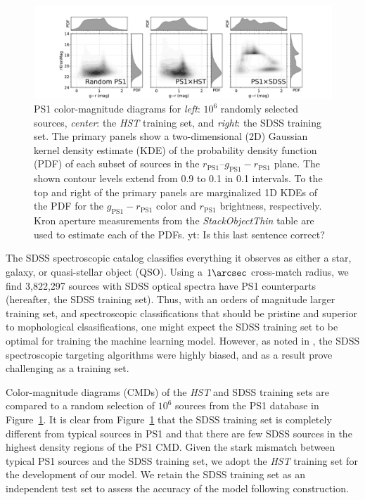 \documentclass[twocolumn]{aastex62}
\newcommand{\yutaro}[1]{{\color{red} yt: {#1}}}
\begin{document}
\begin{figure}[htb]
 \centering
  \includegraphics[width=7.2in]{./Figures/ColorMagDiagramComb.pdf}
  \caption{
  PS1 color-magnitude diagrams for \textit{left}: $10^6$ randomly selected sources, \textit{center}: the \textit{HST} training set, and \textit{right}: the SDSS training set. The primary panels show a two-dimensional (2D) Gaussian kernel density estimate (KDE) of the probability density function (PDF) of each subset of sources in the $r_\mathrm{PS1}$--$g_\mathrm{PS1} - r_\mathrm{PS1}$ plane. The shown contour levels extend from 0.9 to 0.1 in 0.1 intervals. To the top and right of the primary panels are marginalized 1D KDEs of the PDF for the $g_\mathrm{PS1} - r_\mathrm{PS1}$ color and $r_\mathrm{PS1}$ brightness, respectively. Kron aperture measurements from the \textit{StackObjectThin} table are used to estimate each of the PDFs. \yutaro{Is this last sentence correct?}
  }
  \label{fig:cmd}
\end{figure}

The SDSS spectroscopic catalog classifies everything it observes as either a
star, galaxy, or quasi-stellar object (QSO). Using a $1\arcsec$ cross-match
radius, we find 3,822,297 sources with SDSS optical spectra have PS1
counterparts (hereafter, the SDSS training set). Thus, with an orders of
magnitude larger training set, and spectroscopic classifications that should
be pristine and superior to mophological clsasifications, one might expect
the SDSS training set to be optimal for training the machine learning model.
However, as noted in \citep{Miller17}, the SDSS spectroscopic targeting
algorithms were highly biased, and as a result prove challenging as a
training set.

Color-magnitude diagrams (CMDs) of the \textit{HST} and SDSS training sets
are compared to a random selection of $10^6$ sources from the PS1 database in
Figure~\ref{fig:cmd}. It is clear from Figure~\ref{fig:cmd} that the SDSS
training set is completely different from typical sources in PS1 and that
there are few SDSS sources in the highest density regions of the PS1 CMD.
Given the stark mismatch between typical PS1 sources and the SDSS training
set, we adopt the \textit{HST} training set for the development of our model.
We retain the SDSS training set as an independent test set to assess the
accuracy of the model following construction.
\end{document}
